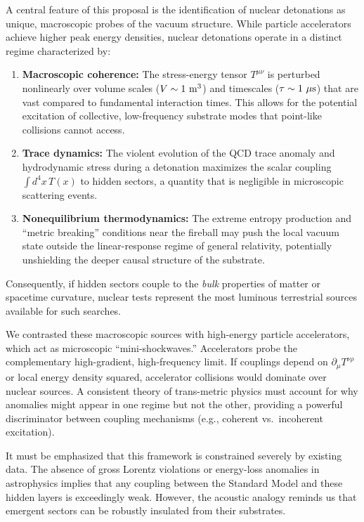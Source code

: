 \documentclass[aps,prd,twocolumn,nofootinbib,superscriptaddress]{revtex4-2}
\begin{document}
A central feature of this proposal is the identification of nuclear detonations as unique, macroscopic probes of the vacuum structure. While particle accelerators achieve higher peak energy densities, nuclear detonations operate in a distinct regime characterized by:
\begin{enumerate}
    \item \textbf{Macroscopic coherence:} The stress-energy tensor $T^{\mu\nu}$ is perturbed nonlinearly over volume scales ($V \sim 1~{\rm m}^3$) and timescales ($\tau \sim 1~\mu{\rm s}$) that are vast compared to fundamental interaction times. This allows for the potential excitation of collective, low-frequency substrate modes that point-like collisions cannot access.
    \item \textbf{Trace dynamics:} The violent evolution of the QCD trace anomaly and hydrodynamic stress during a detonation maximizes the scalar coupling $\int d^4x \, T(x)$ to hidden sectors, a quantity that is negligible in microscopic scattering events.
    \item \textbf{Nonequilibrium thermodynamics:} The extreme entropy production and ``metric breaking'' conditions near the fireball may push the local vacuum state outside the linear-response regime of general relativity, potentially unshielding the deeper causal structure of the substrate.
\end{enumerate}
Consequently, if hidden sectors couple to the \emph{bulk} properties of matter or spacetime curvature, nuclear tests represent the most luminous terrestrial sources available for such searches.

We contrasted these macroscopic sources with high-energy particle accelerators, which act as microscopic ``mini-shockwaves.'' Accelerators probe the complementary high-gradient, high-frequency limit. If couplings depend on $\partial_\mu T^{\nu\rho}$ or local energy density squared, accelerator collisions would dominate over nuclear sources. A consistent theory of trans-metric physics must account for why anomalies might appear in one regime but not the other, providing a powerful discriminator between coupling mechanisms (e.g., coherent vs.\ incoherent excitation).

It must be emphasized that this framework is constrained severely by existing data. The absence of gross Lorentz violations or energy-loss anomalies in astrophysics implies that any coupling between the Standard Model and these hidden layers is exceedingly weak. However, the acoustic analogy reminds us that emergent sectors can be robustly insulated from their substrates.
\end{document}
